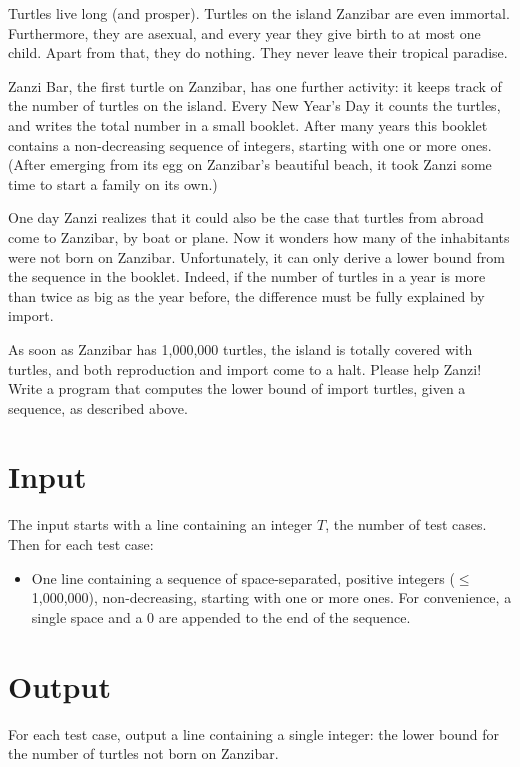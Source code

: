 


Turtles live long (and prosper). Turtles on the island Zanzibar 
are even immortal. Furthermore, they are asexual, and every year
they give birth to at most one child. 
Apart from that, they do nothing. They never leave 
their tropical paradise.

Zanzi Bar, the first turtle on Zanzibar,
has one further activity: it keeps track
of the number of turtles on the island.
Every New Year's Day it counts the turtles, and writes
the total number in a small booklet. 
After many years this booklet contains a non-decreasing
sequence of integers, starting with one or more ones. 
(After emerging from its egg on Zanzibar's beautiful beach,
it took Zanzi some time to start a family on its own.)

One day Zanzi realizes that it could also
be the case that turtles from abroad come to Zanzibar, by boat or plane.
Now it wonders how many of the inhabitants were not born on Zanzibar.
Unfortunately, it can only derive a lower bound from 
the sequence in the booklet. Indeed, if the number of turtles in a year
is more than twice as big as the year before, the difference
must be fully explained by import.

As soon as Zanzibar has 1,000,000 turtles, the island is totally covered
with turtles, and both reproduction and import come to a halt.
Please help Zanzi! Write a program that computes the
lower bound of import turtles, given a sequence, as described above.


\section*{Input}
	The input starts with a line containing an integer $T$, the number of test cases. Then for each test case:
	\begin{itemize}
		\item One line containing a sequence of space-separated, positive integers ($\leq$ 1,000,000), non-decreasing, starting with one or more ones. For convenience, a single space and a 0 are appended to the end of the sequence.
	\end{itemize}
 


\section*{Output}
	For each test case, output a line containing a single integer: the lower bound for the number of turtles not born on Zanzibar.
